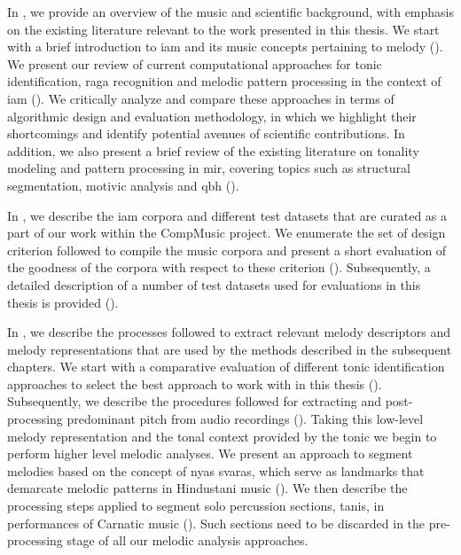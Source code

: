 In , we provide an overview of the music and scientific background, with emphasis on the existing literature relevant to the work presented in this thesis. We start with a brief introduction to \gls{iam} and its music concepts pertaining to melody (). We present our review of current computational approaches for tonic identification, \gls{raga} recognition and melodic pattern processing in the context of \gls{iam} (). We critically analyze and compare these approaches in terms of algorithmic design and evaluation methodology, in which we highlight their shortcomings and identify potential avenues of scientific contributions. In addition, we also present a brief review of the existing literature on tonality modeling and pattern processing in \gls{mir}, covering topics such as structural segmentation, motivic analysis and \gls{qbh} ().

In , we describe the \gls{iam} corpora and different test datasets that are curated as a part of our work within the CompMusic project. We enumerate the set of design criterion followed to compile the music corpora and present a short evaluation of the goodness of the corpora with respect to these criterion (). Subsequently, a detailed description of a number of test datasets used for evaluations in this thesis is provided (). 


In , we describe the processes followed to extract relevant melody descriptors and melody representations that are used by the methods described in the subsequent chapters. We start with a comparative evaluation of different tonic identification approaches to select the best approach to work with in this thesis (). Subsequently, we describe the procedures followed for extracting and post-processing predominant pitch from audio recordings (). Taking this low-level melody representation and the tonal context provided by the tonic we begin to perform higher level melodic analyses. We present an approach to segment melodies based on the concept of \gls{nyas} \glspl{svara}, which serve as landmarks that demarcate melodic patterns in Hindustani music (). We then describe the processing steps applied to segment solo percussion sections, \glspl{tani}, in performances of Carnatic music (). Such sections need to be discarded in the pre-processing stage of all our melodic analysis approaches. 

